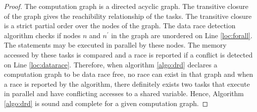 \begin{proof}
The computation graph is a directed acyclic graph. The transitive closure of the graph gives the reachibility relationship of the tasks. The transitive closure is a strict partial order over the nodes of the graph. The data race detection algorithm checks if nodes $n$ and $n^\prime$ in the graph are unordered on Line \ref{loc:forall}. The statements may be executed in parallel by these nodes. The memory accessed by these tasks is compared and a race is reported if a conflict is detected on Line \ref{loc:datarace}. Therefore, when algorithm \ref{algo:drd} declares a computation graph to be data race free, no race can exist in that graph and when a race is reported by the algorithm, there definitely exists two tasks that execute in parallel and have conflicting accesses to a shared variable. Hence, Algorithm \ref{algo:drd} is sound and complete for a given computation graph.
\end{proof}
